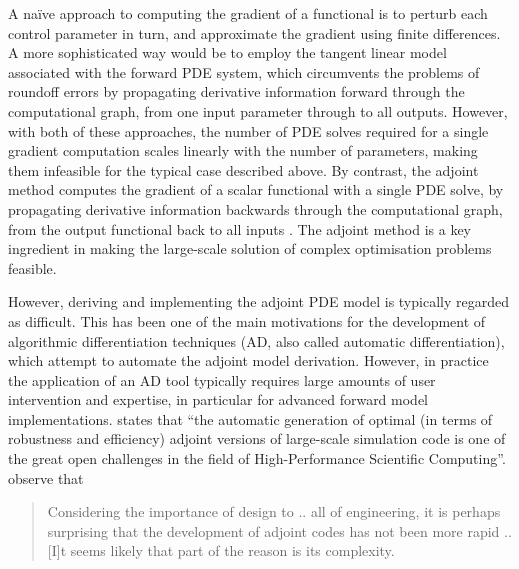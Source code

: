 \documentclass[prodmode,acmtoms]{acmsmall}
\begin{document}
A na\"ive approach to computing the gradient of a functional is to perturb each control
parameter in turn, and approximate the gradient using finite differences. A more sophisticated way would be to employ the
tangent linear model associated with the forward PDE system, which circumvents the problems of
roundoff errors by propagating derivative information forward through the computational graph, from one
input parameter through to all outputs. However, with both of these approaches, the number of PDE
solves required for a single gradient computation scales linearly with the number of parameters,
making them infeasible for the typical case described above. By contrast, the adjoint method
computes the gradient of a scalar functional with a single PDE solve, by propagating derivative information backwards
through the computational graph, from the output functional back to all inputs
\cite{giles2000,griewank2008}.  The adjoint method is a key ingredient in making the large-scale
solution of complex optimisation problems feasible.

However, deriving and implementing the adjoint PDE model is typically regarded as
difficult. This has been one of the main motivations for the development of algorithmic
differentiation techniques (AD, also called automatic differentiation), which attempt to automate
the adjoint model derivation. However, in practice the application of an AD tool typically requires large amounts of user intervention and expertise,
in particular for advanced forward model implementations.   states that ``the automatic generation of optimal (in terms of robustness
and efficiency) adjoint versions of large-scale simulation code is one of the great open challenges
in the field of High-Performance Scientific Computing''.  observe that 
\begin{quote}
Considering the importance of design to .. all of engineering, it is perhaps surprising that the
development of adjoint codes has not been more rapid .. [I]t seems likely that part of the reason is
its complexity. 
\end{quote}
\end{document}
